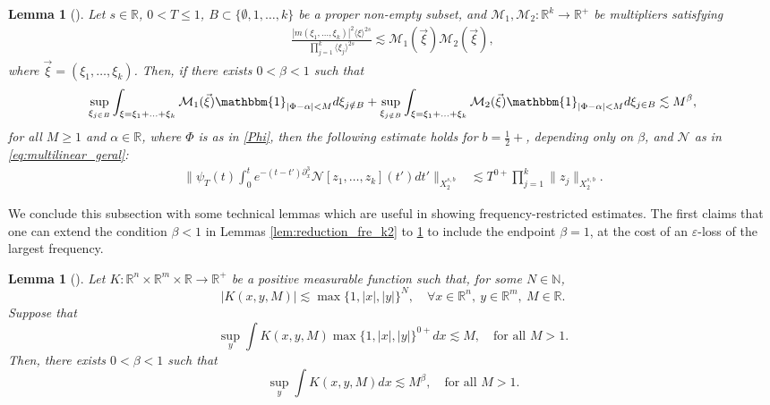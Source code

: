 \documentclass[a4paper,
11pt,  reqno]{amsart}
\newcommand{\jap}[1]{\langle #1 \rangle}
\newcommand{\5}{\textup{V}}
\newcommand{\les}{\lesssim}
\newcommand{\eps}{\varepsilon}
\newtheorem{lemma}[theorem]{Lemma}
\theoremstyle{remark}
\newcommand{\R}{\mathbb{R}}
\newcommand{\al}{\alpha}
\newcommand{\be}{\beta}
\newcommand{\M}{\mathcal{M}}
\numberwithin{equation}{section}
\numberwithin{theorem}{section}
\newcommand{\Ncal}{\mathcal{N}}
\begin{document}
		\begin{lemma}[{\cite[Lemma 2]{COS}}]\label{lem:fre_tri}
			Let $s\in\R$, $0<T\le 1$, $B\subset \{\emptyset, 1, \ldots, k\}$ be a proper non-empty subset, and  $\M_1 , \M_2: \R^{k} \to \R^+$ be multipliers satisfying
            \begin{align}
            \frac{|m(\xi_1, \ldots, \xi_k)|^2\jap{\xi}^{2s}}{\prod_{j=1}^k\jap{\xi_{j}}^{2s}}
            \les 
                \M_1(\vec\xi) \M_2(\vec\xi)
                ,
            \end{align}
            where $\vec\xi=(\xi_1, \ldots, \xi_k)$. 
            Then, if there exists $0<\be<1$ such that
			\begin{equation}\label{L2hypo}
			\sup_{\xi_{j\in B}} \int_{\xi=\xi_1+\ldots + \xi_k} \mathcal{M}_1 (\vec\xi) \mathbbm{1}_{|\Phi-\alpha|<M} d\xi_{j\notin B} + \sup_{\xi_{j\notin B}} \int_{\xi=\xi_1+\ldots+\xi_k} \mathcal{M}_2 (\vec\xi) \mathbbm{1}_{|\Phi-\alpha|<M} d\xi_{j\in B} \lesssim M^\beta, 
			\end{equation}
            for all $M\ge 1$ and $\al\in\R$, 
            where $\Phi$ is as in \eqref{Phi}, 
			then the following estimate holds for {$b=\frac12+$}, depending only on $\be$,
            and $\Ncal$ as in \eqref{eq:multilinear_geral}:
            \begin{align}
				\bigg\|\psi_T(t)\int_0^te^{-(t-t')\partial_x^3}\Ncal[z_1,\dots, z_k](t')dt' \bigg\|_{X^{s,b}_{2}} & \les T^{0+}\prod_{j=1}^k\|z_j\|_{X^{s,b}_{2}}.
			\end{align} 
		\end{lemma}
		


    
         
		We conclude this subsection with some technical lemmas which are useful in showing frequency-restricted estimates.
        The first claims that one can extend the condition $\be<1$ in Lemmas \ref{lem:reduction_fre_k2} to \ref{lem:fre_tri} to include the endpoint $\be=1$, at the cost of an $\eps$-loss of the largest frequency. 
		
		\begin{lemma}[{\cite[Lemma 3.3]{CLS}}]\label{lem:eta1}
			Let $K:\R^n\times \R^m\times \R\to \R^+$ be a positive measurable function such that, for some $N\in \mathbb{N}$,
			$$
			|K(x,y,M)|\lesssim \max\{1,|x|,|y|\}^N,\quad \forall x\in\R^n,\ y\in \R^m, \ M\in \R.
			$$
			Suppose that
			$$
			\sup_y \int K(x,y,M)\max\{1,|x|,|y|\}^{0+} dx \lesssim M,\quad \mbox{for all }M>1.
			$$
			Then, there exists $0<\beta<1$ such that
			$$
			\sup_y \int K(x,y,M) dx \lesssim M^{\beta},\quad \mbox{for all } M>1.
			$$
		\end{lemma}
		
\end{document}
